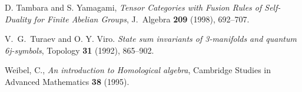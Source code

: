 \documentclass{ws-jktr}
\begin{document}
\begin{thebibliography}{0}
 D. Tambara and S. Yamagami, \emph{Tensor Categories with Fusion Rules of Self-Duality for Finite Abelian Groups}, J.\ Algebra \textbf{209} (1998), 692--707.



 V.\ G.\ Turaev and O. Y. Viro. {\em State sum invariants of 3-manifolds and quantum 6j-symbols}, Topology \textbf{31} (1992), 865--902.

 Weibel, C., {\em An introduction to Homological algebra}, Cambridge Studies in Advanced Mathematics \textbf{38} (1995).





\end{thebibliography}
\end{document}
